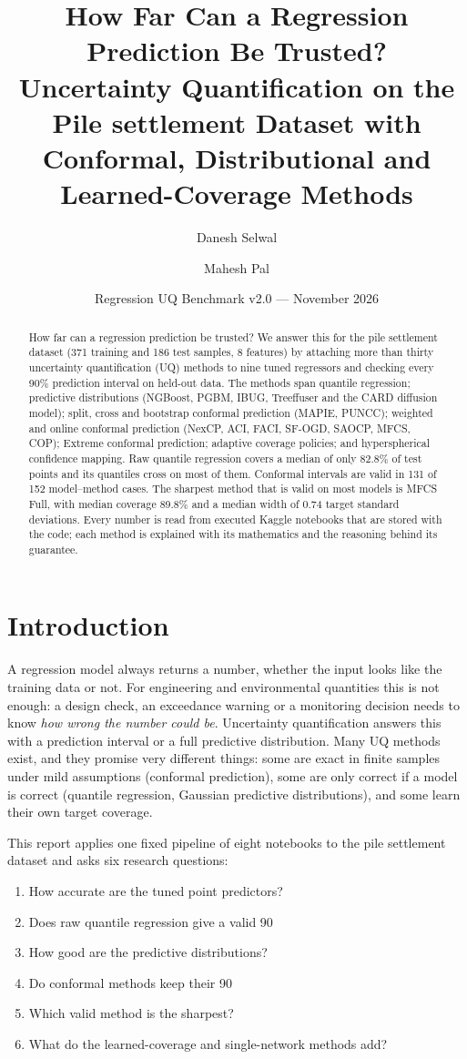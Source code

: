 \documentclass[11pt]{article}
\title{How Far Can a Regression Prediction Be Trusted?\\[2pt] \large Uncertainty Quantification on the Pile settlement Dataset with Conformal, Distributional and Learned-Coverage Methods}
\author{Danesh Selwal \and Mahesh Pal}
\date{Regression UQ Benchmark v2.0 --- November 2026}
\begin{document}
\maketitle
\begin{abstract}How far can a regression prediction be trusted? We answer this for the pile settlement dataset (371 training and 186 test samples, 8 features) by attaching more than thirty uncertainty quantification (UQ) methods to nine tuned regressors and checking every 90\% prediction interval on held-out data. The methods span quantile regression; predictive distributions (NGBoost, PGBM, IBUG, Treeffuser and the CARD diffusion model); split, cross and bootstrap conformal prediction (MAPIE, PUNCC); weighted and online conformal prediction (NexCP, ACI, FACI, SF-OGD, SAOCP, MFCS, COP); Extreme conformal prediction; adaptive coverage policies; and hyperspherical confidence mapping. Raw quantile regression covers a median of only 82.8\% of test points and its quantiles cross on most of them. Conformal intervals are valid in 131 of 152 model--method cases. The sharpest method that is valid on most models is MFCS Full, with median coverage 89.8\% and a median width of 0.74 target standard deviations. Every number is read from executed Kaggle notebooks that are stored with the code; each method is explained with its mathematics and the reasoning behind its guarantee.\end{abstract}
\tableofcontents
\newpage
\section{Introduction}
A regression model always returns a number, whether the input looks like the training data or not. For engineering and environmental
quantities this is not enough: a design check, an exceedance warning or a monitoring decision needs to know \emph{how wrong the number could be}.
Uncertainty quantification answers this with a prediction interval or a full predictive distribution. Many UQ methods exist, and they
promise very different things: some are exact in finite samples under mild assumptions (conformal prediction), some are only correct if a
model is correct (quantile regression, Gaussian predictive distributions), and some learn their own target coverage.

This report applies one fixed pipeline of eight notebooks to the pile settlement dataset and asks six research questions:
\begin{enumerate}[label=\textbf{RQ\arabic*.}]
\item How accurate are the tuned point predictors?
\item Does raw quantile regression give a valid 90%
\item How good are the predictive distributions?
\item Do conformal methods keep their 90%
\item Which valid method is the sharpest?
\item What do the learned-coverage and single-network methods add?
\end{enumerate}
\end{document}
